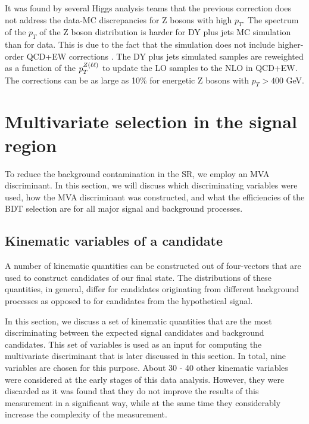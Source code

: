 \begin{itemize}
It was found by several Higgs analysis teams that the previous correction does not address the data-MC discrepancies for Z bosons with high $p_T$. The spectrum of the $p_T$ of the Z boson distribution is harder for DY plus jets MC simulation than for data. This is due to the fact that the simulation does not include higher-order QCD+EW corrections \cite{NLO_Vjets}. The DY plus jets simulated samples are reweighted as a function of the $p_T^{Z(\ell\ell)}$ to update the LO samples to the NLO in QCD+EW. The corrections can be as large as 10\% for energetic Z bosons with $p_T > 400$ GeV.

\end{itemize}

\section{Multivariate selection in the signal region}

To reduce the background contamination in the SR, we employ an MVA discriminant. In this section, we will discuss which discriminating variables were used, how the MVA discriminant was constructed, and what the efficiencies of the BDT selection are for all major signal and background processes. 
\label{sec:BDT}

\subsection{Kinematic variables of a candidate}
\label{variables}

A number of kinematic quantities can be constructed out of four-vectors that are used to construct candidates of our final state. The distributions of these quantities, in general, differ for candidates originating from different background processes as opposed to for candidates from the hypothetical signal. 

In this section, we discuss a set of kinematic quantities that are the most discriminating between the expected signal candidates and background candidates. This set of variables is used as an input for computing the multivariate discriminant that is later discussed in this section. In total, nine variables are chosen for this purpose. About 30 - 40 other kinematic variables were considered at the early stages of this data analysis. However, they were discarded as it was found that they do not improve the results of this measurement in a significant way, while at the same time they considerably increase the complexity of the measurement.

